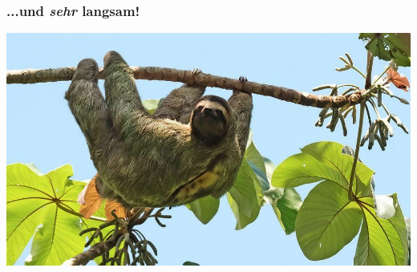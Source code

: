 \documentclass[aspectratio=43,x11names]{beamer}
\begin{document}
\begin{frame}
\frametitle{...und \emph{sehr} langsam!}
\begin{center}
\includegraphics[height=0.65\textheight, keepaspectratio]{images/sloth}
\end{center}
\end{frame}
\end{document}
